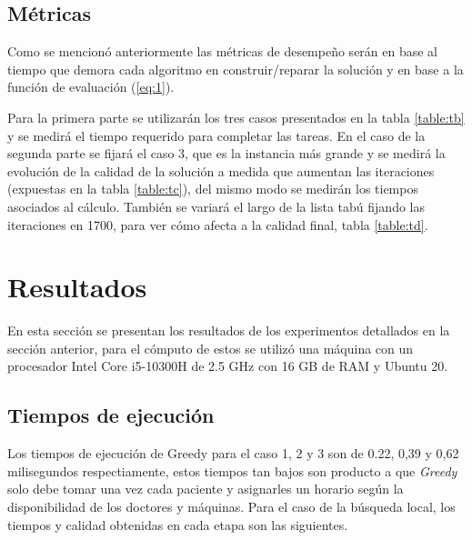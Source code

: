 \documentclass[letter, 10pt]{article}
\begin{document}
\subsection{Métricas}
Como se mencionó anteriormente las métricas de desempeño serán en base al tiempo que demora cada algoritmo en construir/reparar la solución y en base a la función de evaluación (\ref{eq:1}).

Para la primera parte se utilizarán los tres casos presentados en la tabla \ref{table:tb} y se medirá el tiempo requerido para completar las tareas. En el caso de la segunda parte se fijará el caso 3, que es la instancia más grande y se medirá la evolución de la calidad de la solución a medida que aumentan las iteraciones (expuestas en la tabla \ref{table:tc}), del mismo modo se medirán los tiempos asociados al cálculo. También se variará el largo de la lista tabú fijando las iteraciones en 1700, para ver cómo afecta a la calidad final, tabla  \ref{table:td}.

\section{Resultados}
En esta sección se presentan los resultados de los experimentos detallados en la sección anterior, para el cómputo de estos se utilizó una máquina con un procesador Intel Core i5-10300H de 2.5 GHz con 16 GB de RAM y Ubuntu 20.

\subsection{Tiempos de ejecución}
Los tiempos de ejecución de Greedy para el caso 1, 2 y 3 son de 0.22, 0,39 y 0,62 milisegundos respectiamente, estos tiempos tan bajos son producto a que \textit{Greedy} solo debe tomar una vez cada paciente y asignarles un horario según la disponibilidad de los doctores y máquinas. Para el caso de la búsqueda local, los tiempos y calidad obtenidas en cada etapa son las siguientes.
\end{document}
